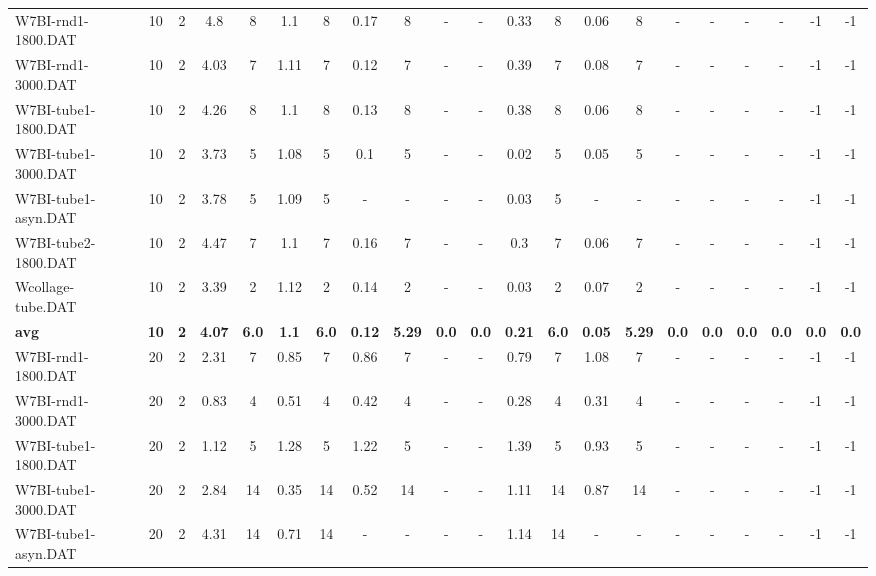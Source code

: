 \begin{sidewaystable}[!ht]
{\begin{tabular}{lcccccccccccccccccccc}
W7BI-rnd1-1800.DAT & 10 & 2 & 4.8 & 8 & 1.1 & 8 & 0.17 & 8 &  - &  - & 0.33 & 8 &  \textcolor{blue2}{0.06} & 8 &  - &  - &  - &  - & -1 & -1 \\
W7BI-rnd1-3000.DAT & 10 & 2 & 4.03 & 7 & 1.11 & 7 & 0.12 & 7 &  - &  - & 0.39 & 7 &  \textcolor{blue2}{0.08} & 7 &  - &  - &  - &  - & -1 & -1 \\
W7BI-tube1-1800.DAT & 10 & 2 & 4.26 & 8 & 1.1 & 8 & 0.13 & 8 &  - &  - & 0.38 & 8 &  \textcolor{blue2}{0.06} & 8 &  - &  - &  - &  - & -1 & -1 \\
W7BI-tube1-3000.DAT & 10 & 2 & 3.73 & 5 & 1.08 & 5 & 0.1 & 5 &  - &  - &  \textcolor{blue2}{0.02} & 5 & 0.05 & 5 &  - &  - &  - &  - & -1 & -1 \\
W7BI-tube1-asyn.DAT & 10 & 2 & 3.78 & 5 & 1.09 & 5 &  - &  - &  - &  - &  \textcolor{blue2}{0.03} & 5 &  - &  - &  - &  - &  - &  - & -1 & -1 \\
W7BI-tube2-1800.DAT & 10 & 2 & 4.47 & 7 & 1.1 & 7 & 0.16 & 7 &  - &  - & 0.3 & 7 &  \textcolor{blue2}{0.06} & 7 &  - &  - &  - &  - & -1 & -1 \\
Wcollage-tube.DAT & 10 & 2 & 3.39 & 2 & 1.12 & 2 & 0.14 & 2 &  - &  - &  \textcolor{blue2}{0.03} & 2 & 0.07 & 2 &  - &  - &  - &  - & -1 & -1 \\
\cline{1-21} \textbf{avg} & \textbf{10} & \textbf{2} & \textbf{4.07} & \textbf{6.0} & \textbf{1.1} & \textbf{6.0} & \textbf{0.12} & \textbf{5.29} & \textbf{0.0} & \textbf{0.0} & \textbf{0.21} & \textbf{6.0} & \textbf{0.05} & \textbf{5.29} & \textbf{0.0} & \textbf{0.0} & \textbf{0.0} & \textbf{0.0} & \textbf{0.0} & \textbf{0.0} \\ \cline{1-21}
W7BI-rnd1-1800.DAT & 20 & 2 & 2.31 & 7 & 0.85 & 7 & 0.86 & 7 &  - &  - &  \textcolor{blue2}{0.79} & 7 & 1.08 & 7 &  - &  - &  - &  - & -1 & -1 \\
W7BI-rnd1-3000.DAT & 20 & 2 & 0.83 & 4 & 0.51 & 4 & 0.42 & 4 &  - &  - &  \textcolor{blue2}{0.28} & 4 & 0.31 & 4 &  - &  - &  - &  - & -1 & -1 \\
W7BI-tube1-1800.DAT & 20 & 2 & 1.12 & 5 & 1.28 & 5 & 1.22 & 5 &  - &  - & 1.39 & 5 &  \textcolor{blue2}{0.93} & 5 &  - &  - &  - &  - & -1 & -1 \\
W7BI-tube1-3000.DAT & 20 & 2 & 2.84 & 14 &  \textcolor{blue2}{0.35} & 14 & 0.52 & 14 &  - &  - & 1.11 & 14 & 0.87 & 14 &  - &  - &  - &  - & -1 & -1 \\
W7BI-tube1-asyn.DAT & 20 & 2 & 4.31 & 14 &  \textcolor{blue2}{0.71} & 14 &  - &  - &  - &  - & 1.14 & 14 &  - &  - &  - &  - &  - &  - & -1 & -1 \\

\end{tabular}}
\end{sidewaystable}
